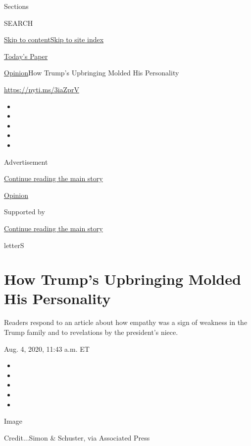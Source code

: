 Sections

SEARCH

\protect\hyperlink{site-content}{Skip to
content}\protect\hyperlink{site-index}{Skip to site index}

\href{https://myaccount.nytimes3xbfgragh.onion/auth/login?response_type=cookie\&client_id=vi}{}

\href{https://www.nytimes3xbfgragh.onion/section/todayspaper}{Today's
Paper}

\href{/section/opinion}{Opinion}\textbar{}How Trump's Upbringing Molded
His Personality

\url{https://nyti.ms/3iaZprV}

\begin{itemize}
\item
\item
\item
\item
\item
\end{itemize}

Advertisement

\protect\hyperlink{after-top}{Continue reading the main story}

\href{/section/opinion}{Opinion}

Supported by

\protect\hyperlink{after-sponsor}{Continue reading the main story}

letterS

\hypertarget{how-trumps-upbringing-molded-his-personality}{%
\section{How Trump's Upbringing Molded His
Personality}\label{how-trumps-upbringing-molded-his-personality}}

Readers respond to an article about how empathy was a sign of weakness
in the Trump family and to revelations by the president's niece.

Aug. 4, 2020, 11:43 a.m. ET

\begin{itemize}
\item
\item
\item
\item
\item
\end{itemize}

Image

Credit...Simon \& Schuster, via Associated Press

